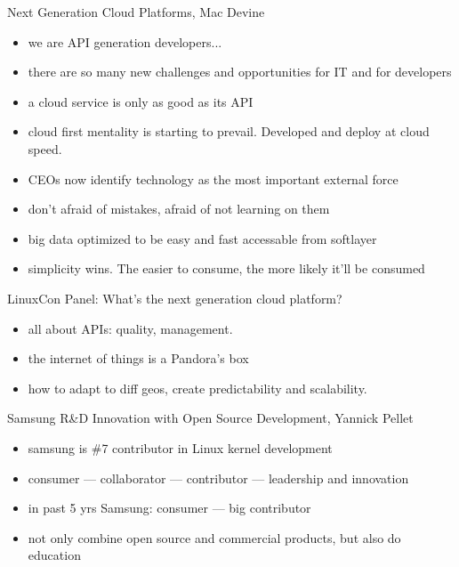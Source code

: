 \documentclass[aspectratio=169]{beamer}
\begin{document}
\begin{frame}{Next Generation Cloud Platforms, Mac Devine}
  \begin{itemize}
  \item we are API generation developers...
  \item there are so many new challenges and opportunities for IT and for developers
  \item a cloud service is only as good as its API
  \item cloud first mentality is starting to prevail. Developed and deploy at cloud speed.
  \item CEOs now identify technology as the most important external force
  \item don't afraid of mistakes, afraid of not learning on them
  \item big data optimized to be easy and fast accessable from softlayer
  \item simplicity wins. The easier to consume, the more likely it'll be consumed
  \end{itemize}
\end{frame}

\begin{frame}{LinuxCon Panel: What's the next generation cloud platform?}
  \begin{itemize}
  \item all about APIs: quality, management.
  \item the internet of things is a Pandora's box
  \item how to adapt to diff geos, create predictability and scalability.
  \end{itemize}
\end{frame}

\begin{frame}{Samsung R\&D Innovation with Open Source Development, Yannick Pellet}
  \begin{itemize}
  \item samsung is \#7 contributor in Linux kernel development
  \item consumer --- collaborator --- contributor --- leadership and innovation
  \item in past 5 yrs Samsung: consumer --- big contributor
  \item not only combine open source and commercial products, but also do education
  \end{itemize}
\end{frame}
\end{document}
